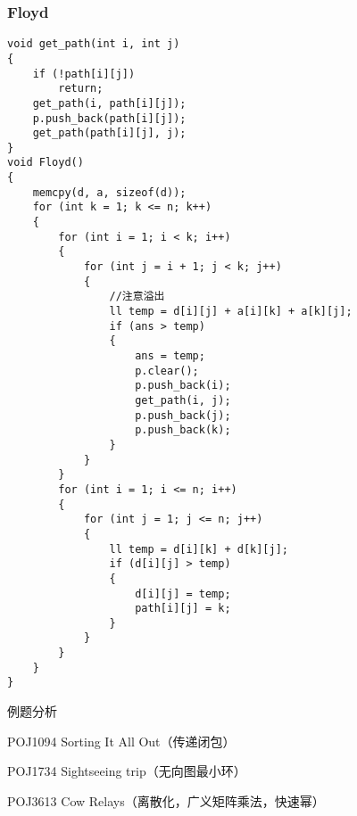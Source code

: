 \subsubsection{Floyd}
\begin{lstlisting}
void get_path(int i, int j)
{
    if (!path[i][j])
        return;
    get_path(i, path[i][j]);
    p.push_back(path[i][j]);
    get_path(path[i][j], j);
}
void Floyd()
{
    memcpy(d, a, sizeof(d));
    for (int k = 1; k <= n; k++)
    {
        for (int i = 1; i < k; i++)
        {
            for (int j = i + 1; j < k; j++)
            {
                //注意溢出
                ll temp = d[i][j] + a[i][k] + a[k][j];
                if (ans > temp)
                {
                    ans = temp;
                    p.clear();
                    p.push_back(i);
                    get_path(i, j);
                    p.push_back(j);
                    p.push_back(k);
                }
            }
        }
        for (int i = 1; i <= n; i++)
        {
            for (int j = 1; j <= n; j++)
            {
                ll temp = d[i][k] + d[k][j];
                if (d[i][j] > temp)
                {
                    d[i][j] = temp;
                    path[i][j] = k;
                }
            }
        }
    }
}
\end{lstlisting}
例题分析

POJ1094 Sorting It All Out（传递闭包）

POJ1734 Sightseeing trip（无向图最小环）

POJ3613 Cow Relays（离散化，广义矩阵乘法，快速幂）

